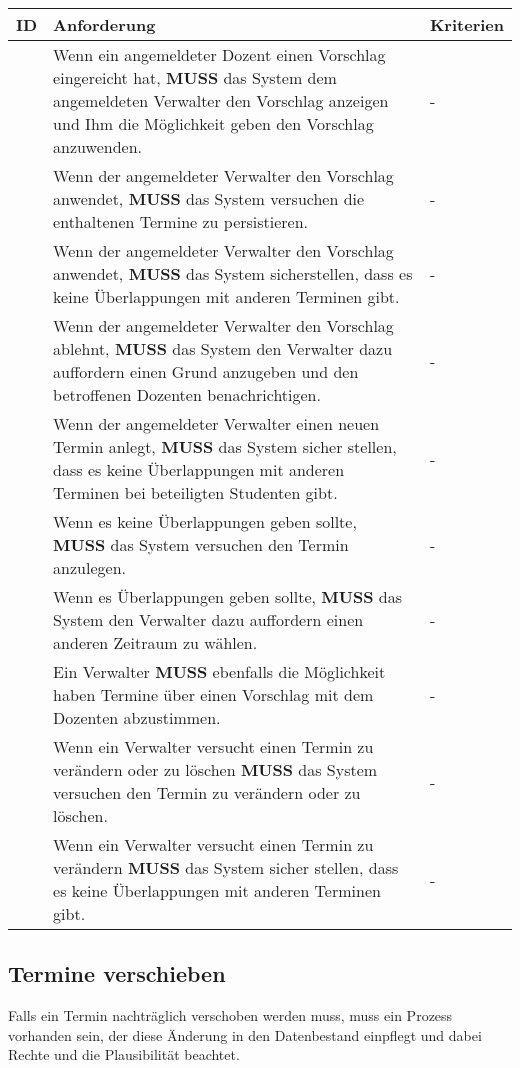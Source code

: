 \begin{tabular} {|p{}|p{}|p{}|}
	\hline
	ID & Anforderung & Kriterien \\
	\hline
	\printfreqnr
	& Wenn ein angemeldeter Dozent einen Vorschlag eingereicht hat, \textbf{MUSS} das System dem angemeldeten Verwalter den Vorschlag anzeigen und Ihm die Möglichkeit geben den Vorschlag anzuwenden. 
	& - \\
	\hline
	\printfreqnr
	& Wenn der angemeldeter Verwalter den Vorschlag anwendet, \textbf{MUSS} das System versuchen die enthaltenen Termine zu persistieren.
	& - \\
	\hline
	\printfreqnr
	& Wenn der angemeldeter Verwalter den Vorschlag anwendet, \textbf{MUSS} das System sicherstellen, dass es keine Überlappungen mit anderen Terminen gibt.
	& - \\
	\hline
	\printfreqnr
	& Wenn der angemeldeter Verwalter den Vorschlag ablehnt, \textbf{MUSS} das System den Verwalter dazu auffordern einen Grund anzugeben und den betroffenen Dozenten benachrichtigen.
	& - \\
	\hline
	\printfreqnr
	& Wenn der angemeldeter Verwalter einen neuen Termin anlegt, \textbf{MUSS} das System sicher stellen, dass es keine Überlappungen mit anderen Terminen bei beteiligten Studenten gibt.
	& - \\
	\hline
	\printfreqnr
	& Wenn es keine Überlappungen geben sollte, \textbf{MUSS} das System versuchen den Termin anzulegen.
	& - \\
	\hline
	\printfreqnr
	& Wenn es Überlappungen geben sollte, \textbf{MUSS} das System den Verwalter dazu auffordern einen anderen Zeitraum zu wählen.
	& - \\
	\hline
	\printfreqnr
	& Ein Verwalter \textbf{MUSS} ebenfalls die Möglichkeit haben Termine über einen Vorschlag mit dem Dozenten abzustimmen.
	& - \\
	\hline
	\printfreqnr
	& Wenn ein Verwalter versucht einen Termin zu verändern oder zu löschen \textbf{MUSS} das System versuchen den Termin zu verändern oder zu löschen.
	& - \\
	\hline
	\printfreqnr
	& Wenn ein Verwalter versucht einen Termin zu verändern \textbf{MUSS} das System sicher stellen, dass es keine Überlappungen mit anderen Terminen gibt.
	& - \\
	\hline
\end{tabular}

\newpage

\subsection{Termine verschieben}
Falls ein Termin nachträglich verschoben werden muss, muss ein Prozess vorhanden sein, der diese Änderung in den Datenbestand einpflegt und dabei Rechte und die Plausibilität beachtet.

